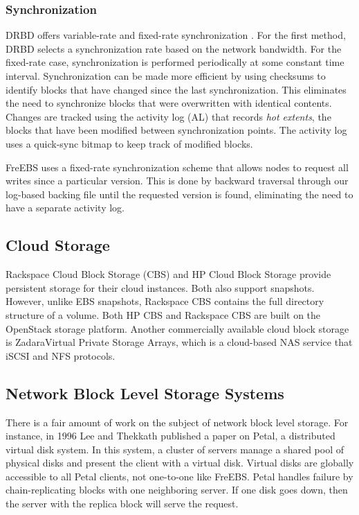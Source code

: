 \subsubsection{Synchronization} 
DRBD\textsuperscript{\textregistered} offers 
variable-rate and fixed-rate synchronization \cite{drbd_manual}.
For the first method, DRBD\textsuperscript{\textregistered} selects a 
synchronization rate
based on the network bandwidth. For the fixed-rate case, synchronization is
performed periodically at some constant time interval. Synchronization 
can be made more efficient by using checksums to identify blocks that have 
changed since the last synchronization. This eliminates the need to 
synchronize blocks that were overwritten with identical contents. Changes
are tracked using the activity log (AL) that records \emph{hot extents}, 
the blocks that have been modified between synchronization points. The 
activity log uses a quick-sync bitmap to keep track of modified blocks.

FreEBS uses a fixed-rate synchronization scheme that allows nodes to request 
all writes since a particular version. This is done by backward traversal 
through our log-based backing file until the requested version is found, 
eliminating the need to have a separate activity log.


\subsection{Cloud Storage}
Rackspace Cloud Block Storage (CBS) and HP Cloud Block Storage provide 
persistent storage for their cloud instances\cite{rackspace, hp}. Both also 
support snapshots. However, unlike EBS snapshots, Rackspace CBS contains the 
full directory structure of a volume. Both HP CBS and Rackspace CBS are 
built on the OpenStack storage platform. Another commercially available 
cloud block storage is Zadara\texttrademark Virtual Private Storage 
Arrays\cite{zadara}, which is a cloud-based NAS service that iSCSI and NFS 
protocols.  

\subsection{Network Block Level Storage Systems}
There is a fair amount of work on the subject of network block level storage.
For instance, in 1996 Lee and Thekkath published a paper on Petal, a 
distributed virtual disk system\cite{lee1996petal}. In this system, a cluster
of servers manage a shared pool of physical disks and present the client 
with a virtual disk. Virtual disks are globally accessible to all
Petal clients, not one-to-one like FreEBS. Petal handles failure by 
chain-replicating blocks with one neighboring server. If one disk goes down,
then the server with the replica block will serve the request. 


